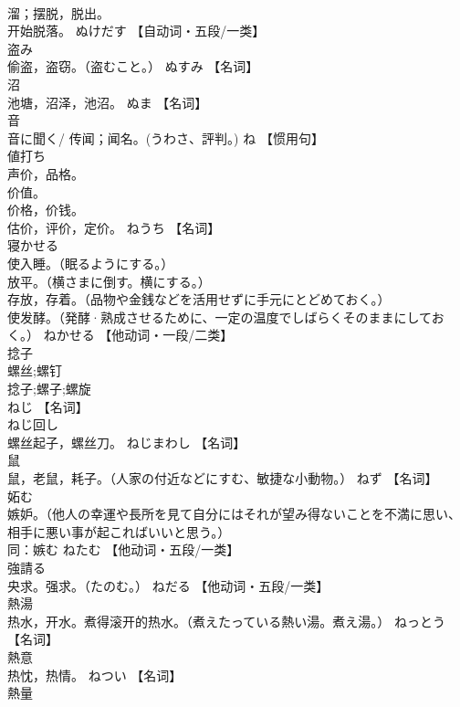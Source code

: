 \documentclass[8pt]{extreport}
\begin{document}
\begin{CJK}{UTF8}{min}
\\	溜；摆脱，脱出。 
\\	开始脱落。	ぬけだす		【自动词・五段/一类】
\\	盗み	
\\	偷盗，盗窃。（盗むこと。）	ぬすみ		【名词】
\\	沼	
\\	池塘，沼泽，池沼。	ぬま		【名词】
\\	音	
\\	音に聞く/ 传闻；闻名。(うわさ、評判。)	ね		【惯用句】
\\	値打ち	
\\	声价，品格。 
\\	价值。 
\\	价格，价钱。 
\\	估价，评价，定价。	ねうち		【名词】
\\	寝かせる	
\\	使入睡。（眠るようにする。） 
\\	放平。（横さまに倒す。横にする。） 
\\	存放，存着。（品物や金銭などを活用せずに手元にとどめておく。） 
\\	使发酵。（発酵·熟成させるために、一定の温度でしばらくそのままにしておく。）	ねかせる		【他动词・一段/二类】
\\	捻子	
\\	螺丝;螺钉 
\\	捻子;螺子;螺旋 
\\	ねじ		【名词】
\\	ねじ回し	
\\	螺丝起子，螺丝刀。	ねじまわし		【名词】
\\	鼠	
\\	鼠，老鼠，耗子。（人家の付近などにすむ、敏捷な小動物。）	ねず		【名词】
\\	妬む	
\\	嫉妒。（他人の幸運や長所を見て自分にはそれが望み得ないことを不満に思い、相手に悪い事が起こればいいと思う。） 
\\	同：嫉む	ねたむ		【他动词・五段/一类】
\\	強請る	
\\	央求。强求。（たのむ。）	ねだる		【他动词・五段/一类】
\\	熱湯	
\\	热水，开水。煮得滚开的热水。（煮えたっている熱い湯。煮え湯。）	ねっとう		【名词】
\\	熱意	
\\	热忱，热情。	ねつい		【名词】
\\	熱量	

\end{CJK}
\end{document}

